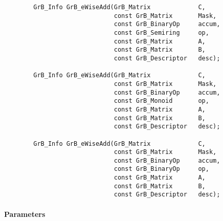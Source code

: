 \begin{verbatim}
        GrB_Info GrB_eWiseAdd(GrB_Matrix             C,
                              const GrB_Matrix       Mask,
                              const GrB_BinaryOp     accum,
                              const GrB_Semiring     op, 
                              const GrB_Matrix       A,
                              const GrB_Matrix       B,
                              const GrB_Descriptor   desc);

        GrB_Info GrB_eWiseAdd(GrB_Matrix             C,
                              const GrB_Matrix       Mask,
                              const GrB_BinaryOp     accum,
                              const GrB_Monoid       op, 
                              const GrB_Matrix       A,
                              const GrB_Matrix       B,
                              const GrB_Descriptor   desc);

        GrB_Info GrB_eWiseAdd(GrB_Matrix             C,
                              const GrB_Matrix       Mask,
                              const GrB_BinaryOp     accum,
                              const GrB_BinaryOp     op, 
                              const GrB_Matrix       A,
                              const GrB_Matrix       B,
                              const GrB_Descriptor   desc);
\end{verbatim}

\paragraph{Parameters}

